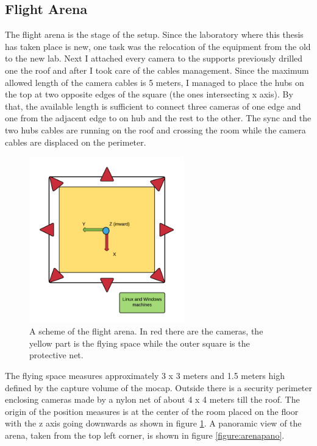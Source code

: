 \subsection{Flight Arena}
The flight arena is the stage of the setup. Since the laboratory where this thesis has taken place is new, one task was the relocation of the equipment from the old to the new lab. Next I attached every camera to the supports previously drilled one the roof and after I took care of the cables management. Since the maximum allowed length of the camera cables is 5 meters, I managed to place the hubs on the top at two opposite edges of the square (the ones intersecting x axis). By that, the available length is sufficient to connect three cameras of one edge and one from the adjacent edge to on hub and the rest to the other. The sync and the two hubs cables are running on the roof and crossing the room while the camera cables are displaced on the perimeter.   
\begin{figure}[h]
\centering
 \includegraphics[width=0.6\textwidth]{flight_arena.png}
 \caption[Flight arena]{A scheme of the flight arena. In red there are the cameras, the yellow part is the flying space while the outer square is the protective net.}
 \label{figure:arena}
\end{figure}
\noindent
The flying space measures approximately 3 x 3 meters and 1.5 meters high defined by the capture volume of the mocap. Outside there is a security perimeter enclosing cameras made by a nylon net of about 4 x 4 meters till the roof. The origin of the position measures is at the center of the room placed on the floor with the z axis going downwards as shown in figure \ref{figure:arena}. A panoramic view of the arena, taken from the top left corner, is shown in figure \ref{figure:arenapano}. 

